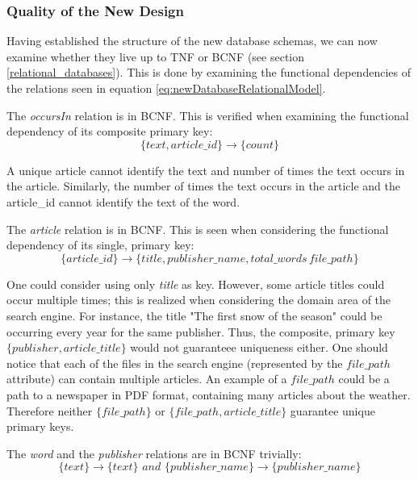\subsubsection*{Quality of the New Design}
Having established the structure of the new database schemas, we can now examine whether they live up to TNF or BCNF (see section \ref{relational_databases}).
This is done by examining the functional dependencies of the relations seen in equation \ref{eq:newDatabaseRelationalModel}.

The \textit{occursIn} relation is in BCNF. 
This is verified when examining the functional dependency of its composite primary key:
\begin{equation*}
 \{text,article\_id\}\rightarrow \{count\}   
\end{equation*}

A unique article cannot identify the text and number of times the text occurs in the article.
Similarly, the number of times the text occurs in the article and the article\_id cannot identify the text of the word.

The \textit{article} relation is in BCNF. 
This is seen when considering the functional dependency of its single, primary key:
\begin{equation*}
    \{article\_id\} \rightarrow \{title, publisher\_name,total\_words\, file\_path\}
\end{equation*}

One could consider using only \textit{title} as key. 
However, some article titles could occur multiple times; this is realized when considering the domain area of the \knox{} search engine.
For instance, the title "The first snow of the season" could be occurring every year for the same publisher.
Thus, the composite, primary key $\{ publisher,article\_title \}$ would not guaranteee uniqueness either.
One should notice that each of the files in the search engine (represented by the $file\_path$ attribute) can contain multiple articles.
An example of a $file\_path$ could be a path to a newspaper in PDF format, containing many articles about the weather.
Therefore neither $\{file\_path\}$ or $\{ file\_path, article\_title \}$ guarantee unique primary keys.


The \textit{word} and the \textit{publisher} relations are in BCNF trivially:
\begin{equation*}
    \{ text\} \rightarrow \{text\} \textit{\ and\ } \{ publisher\_name \} \rightarrow \{ publisher\_name\}
\end{equation*}

